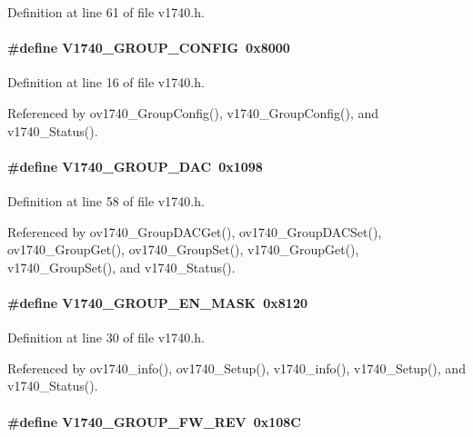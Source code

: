 Definition at line 61 of file v1740.h.
\paragraph[{V1740\_\-GROUP\_\-CONFIG}]{\setlength{\rightskip}{0pt plus 5cm}\#define V1740\_\-GROUP\_\-CONFIG~0x8000}\hfill\label{v1740_8h_a74f2edc73e41cff9fe2113aa1bb97905}


Definition at line 16 of file v1740.h.

Referenced by ov1740\_\-GroupConfig(), v1740\_\-GroupConfig(), and v1740\_\-Status().
\paragraph[{V1740\_\-GROUP\_\-DAC}]{\setlength{\rightskip}{0pt plus 5cm}\#define V1740\_\-GROUP\_\-DAC~0x1098}\hfill\label{v1740_8h_acbfbad24d1acb3a4b93eb2cc8d9e8bda}


Definition at line 58 of file v1740.h.

Referenced by ov1740\_\-GroupDACGet(), ov1740\_\-GroupDACSet(), ov1740\_\-GroupGet(), ov1740\_\-GroupSet(), v1740\_\-GroupGet(), v1740\_\-GroupSet(), and v1740\_\-Status().
\paragraph[{V1740\_\-GROUP\_\-EN\_\-MASK}]{\setlength{\rightskip}{0pt plus 5cm}\#define V1740\_\-GROUP\_\-EN\_\-MASK~0x8120}\hfill\label{v1740_8h_a6fcf9d42e96405bb8be26bf7e79236a4}


Definition at line 30 of file v1740.h.

Referenced by ov1740\_\-info(), ov1740\_\-Setup(), v1740\_\-info(), v1740\_\-Setup(), and v1740\_\-Status().
\paragraph[{V1740\_\-GROUP\_\-FW\_\-REV}]{\setlength{\rightskip}{0pt plus 5cm}\#define V1740\_\-GROUP\_\-FW\_\-REV~0x108C}\hfill\label{v1740_8h_ad25fa8d0891cc825bd21b5b46fe03afd}


